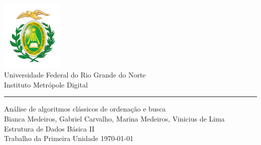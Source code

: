 \documentclass[a4paper,11pt,oneside]{book}
\begin{document}
    
    \frontmatter
    
    \begin{titlepage}      
        \begin{center}
            \includegraphics[width=3cm]{figures/ufrnlogo.png}\\[0.5cm]
            {\LARGE Universidade Federal do Rio Grande do Norte\\[0.5cm]
            Instituto Metrópole Digital}\\[2cm]
			{\color{blue} \rule{\textwidth}{1pt}}
            \linespread{1.2}\huge {
                Análise de algoritmos clássicos de ordenação e busca
            }
            \linespread{1}~\\[2cm]
            {\Large 
              Bianca Medeiros,
              Gabriel Carvalho,
              Marina Medeiros,
              Vinicius de Lima
            }\\[1cm] 
            
            {\large 
                \emph{} Estrutura de Dados Básica II}\\[1cm] %
            
            \large Trabalho da Primeira Unidade
            \vfill
            \today 
        \end{center}
    \end{titlepage}
    
    
    \tableofcontents
    
    \mainmatter
    
\end{document}
